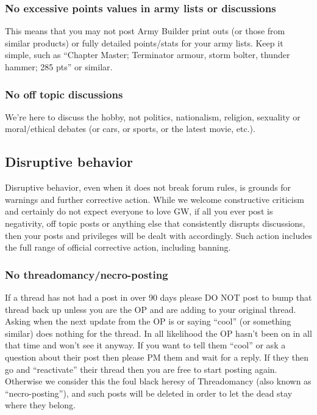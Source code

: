 \documentclass[12pt]{article}
\begin{document}
\subsubsection{No excessive points values in army lists or discussions}

This means that you may not post Army Builder print outs (or those from 
similar products) or fully detailed points/stats for your army lists. 
Keep it simple, such as ``Chapter Master; Terminator armour, storm 
bolter, thunder hammer; 285 pts'' or similar.

\subsubsection{No off topic discussions}

We're here to discuss the hobby, not politics, nationalism, religion, 
sexuality or moral/ethical debates (or cars, or sports, or the latest 
movie, etc.).

\subsection{Disruptive behavior}

Disruptive behavior, even when it does not break forum rules, is 
grounds for warnings and further corrective action. While we welcome 
constructive criticism and certainly do not expect everyone to love GW, 
if all you ever post is negativity, off topic posts or anything else 
that consistently disrupts discussions, then your posts and privileges 
will be dealt with accordingly. Such action includes the full range of 
official corrective action, including banning.

\subsubsection{No threadomancy/necro-posting}

If a thread has not had a post in over 90 days please DO NOT post to 
bump that thread back up unless you are the OP and are adding to your 
original thread. Asking when the next update from the OP is or saying 
``cool'' (or something similar) does nothing for the thread. In all 
likelihood the OP hasn't been on in all that time and won't see it 
anyway. If you want to tell them ``cool'' or ask a question about their 
post then please PM them and wait for a reply. If they then go and 
``reactivate'' their thread then you are free to start posting again. 
Otherwise we consider this the foul black heresy of Threadomancy (also 
known as ``necro-posting''), and such posts will be deleted in order to 
let the dead stay where they belong.
\end{document}
